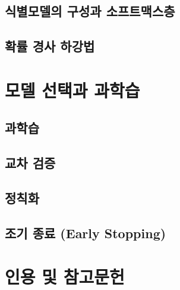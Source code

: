 \documentclass[../main.tex]{subfiles}
\begin{document}
\subsection{식별모델의 구성과 소프트맥스층}
\subsection{확률 경사 하강법}

\section{모델 선택과 과학습}
\subsection{과학습}
\subsection{교차 검증}
\subsection{정칙화}
\subsection{조기 종료 (Early Stopping)}

\section*{인용 및 참고문헌}
\end{document}
